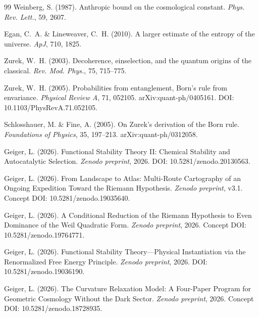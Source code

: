 \documentclass[12pt,a4paper]{article}
\theoremstyle{remark}
\begin{document}
{\begin{thebibliography}{99}
Weinberg, S. (1987).
\newblock Anthropic bound on the cosmological constant.
\newblock \textit{Phys. Rev. Lett.}, 59, 2607.

Egan, C.~A. \& Lineweaver, C.~H. (2010).
\newblock A larger estimate of the entropy of the universe.
\newblock \textit{ApJ}, 710, 1825.

Zurek, W.~H. (2003).
\newblock Decoherence, einselection, and the quantum origins of the classical.
\newblock \textit{Rev. Mod. Phys.}, 75, 715--775.

Zurek, W.~H. (2005).
\newblock Probabilities from entanglement, Born's rule from envariance.
\newblock \textit{Physical Review A}, 71, 052105. arXiv:quant-ph/0405161.
\newblock DOI: 10.1103/PhysRevA.71.052105.

Schlosshauer, M. \& Fine, A. (2005).
\newblock On Zurek's derivation of the Born rule.
\newblock \textit{Foundations of Physics}, 35, 197--213. arXiv:quant-ph/0312058.

Geiger, L. (2026).
\newblock Functional Stability Theory II: Chemical Stability and Autocatalytic Selection.
\newblock \textit{Zenodo preprint}, 2026.
\newblock DOI: 10.5281/zenodo.20130563.

Geiger, L. (2026).
\newblock From Landscape to Atlas: Multi-Route Cartography of an Ongoing Expedition Toward the Riemann Hypothesis.
\newblock \textit{Zenodo preprint}, v3.1.
\newblock Concept DOI: 10.5281/zenodo.19035640.

Geiger, L. (2026).
\newblock A Conditional Reduction of the Riemann Hypothesis to Even Dominance of the Weil Quadratic Form.
\newblock \textit{Zenodo preprint}, 2026.
\newblock Concept DOI: 10.5281/zenodo.19764771.

Geiger, L. (2026).
\newblock Functional Stability Theory---Physical Instantiation via the Renormalized Free Energy Principle.
\newblock \textit{Zenodo preprint}, 2026.
\newblock DOI: 10.5281/zenodo.19036190.

Geiger, L. (2026).
\newblock The Curvature Relaxation Model: A Four-Paper Program for Geometric Cosmology Without the Dark Sector.
\newblock \textit{Zenodo preprint}, 2026.
\newblock Concept DOI: 10.5281/zenodo.18728935.


\end{thebibliography}}
\end{document}
